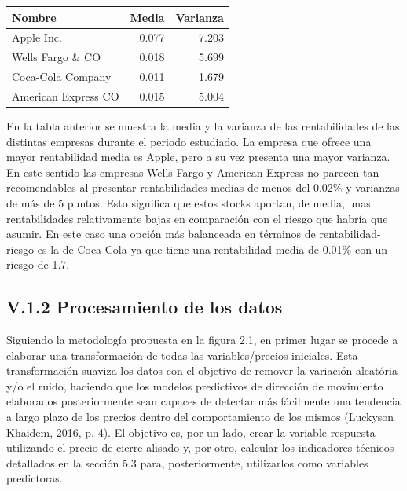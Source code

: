 \documentclass[]{DissertateUSU}
\begin{document}
\setlength\parskip{5ex}
\begin{table}[H]
\centering\begingroup\fontsize{10}{12}\selectfont

\begin{tabular}{l|r|r}
\hline
Nombre & Media & Varianza\\
\hline
Apple Inc. & 0.077 & 7.203\\
\hline
Wells Fargo \& CO & 0.018 & 5.699\\
\hline
Coca-Cola Company & 0.011 & 1.679\\
\hline
American Express CO & 0.015 & 5.004\\
\hline
\end{tabular}
\endgroup{}
\end{table}
\centering

\setlength\parskip{5ex}
\justifying

\noindent En la tabla anterior se muestra la media y la varianza de las
rentabilidades de las distintas empresas durante el periodo estudiado.
La empresa que ofrece una mayor rentabilidad media es Apple, pero a su
vez presenta una mayor varianza. En este sentido las empresas Wells
Fargo y American Express no parecen tan recomendables al presentar
rentabilidades medias de menos del 0.02\% y varianzas de más de 5
puntos. Esto significa que estos stocks aportan, de media, unas
rentabilidades relativamente bajas en comparación con el riesgo que
habría que asumir. En este caso una opción más balanceada en términos de
rentabilidad-riesgo es la de Coca-Cola ya que tiene una rentabilidad
media de 0.01\% con un riesgo de 1.7.

\setlength\parskip{5ex}
\justifying

\FloatBarrier
{}
\fancyfoot[C]{\thepage}

\subsection{V.1.2 \textbf{Procesamiento de los datos}}

\noindent Siguiendo la metodología propuesta en la figura 2.1, en primer
lugar se procede a elaborar una transformación de todas las
variables/precios iniciales. Esta transformación suaviza los datos con
el objetivo de remover la variación aleatória y/o el ruido, haciendo que
los modelos predictivos de dirección de movimiento elaborados
posteriormente sean capaces de detectar más fácilmente una tendencia a
largo plazo de los precios dentro del comportamiento de los mismos
(Luckyson Khaidem, 2016, p. 4). El objetivo es, por un lado, crear la
variable respuesta utilizando el precio de cierre alisado y, por otro,
calcular los indicadores técnicos detallados en la sección 5.3 para,
posteriormente, utilizarlos como variables predictoras.
\end{document}
